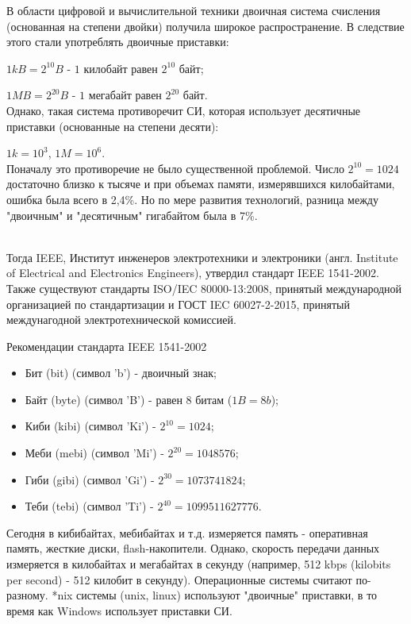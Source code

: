 В области цифровой и вычислительной техники двоичная система счисления (основанная на степени двойки) получила широкое распространение. В следствие этого стали употреблять двоичные приставки:
\item $1 kB = 2^{10} B$ - $1$ килобайт равен $2^{10}$ байт;
\item $1 MB = 2^{20} B$ - $1$ мегабайт равен $2^{20}$ байт.
\\Однако, такая система противоречит СИ, которая использует десятичные приставки (основанные на степени десяти):
\item $1 k = 10^{3}$, $1 M = 10^{6}$.
\\Поначалу это противоречие не было существенной проблемой. Число $2^{10} = 1024$ достаточно близко к тысяче и при объемах памяти, измерявшихся килобайтами, ошибка была всего в 2,4\%. Но по мере развития технологий, разница между "двоичным" и "десятичным" гигабайтом была в 7\%.

\\Тогда IEEE, Институт инженеров электротехники и электроники (англ. Institute of Electrical and Electronics Engineers), утвердил стандарт IEEE 1541-2002. Также существуют стандарты  ISO/IEC 80000-13:2008, принятый международной организацией по стандартизации и ГОСТ IEC 60027-2-2015, принятый междунагодной электротехнической комиссией.
\\
\begin{center}
Рекомендации стандарта IEEE 1541-2002
\end{center}
\begin{itemize}
\item Бит (bit) (символ 'b') - двоичный знак;
\item Байт (byte) (символ 'B') - равен 8 битам ($1B = 8b$);
\item Киби (kibi) (символ 'Ki') - $2^{10} = 1024$;
\item Меби (mebi) (символ 'Mi') - $2^{20} = 1048576$;
\item Гиби (gibi) (символ 'Gi') - $2^{30} = 1073741824$;
\item Теби (tebi) (символ 'Ti') - $2^{40} = 1099511627776$.
\end{itemize}

Сегодня в кибибайтах, мебибайтах и т.д. измеряется память - оперативная память, жесткие диски, flash-накопители. Однако, скорость передачи данных измеряется в килобайтах и мегабайтах в секунду (например, 512 kbps (kilobits per second) - 512 килобит в секунду).
Операционные системы считают по-разному. *nix системы (unix, linux) используют "двоичные" приставки, в то время как Windows использует приставки СИ. 